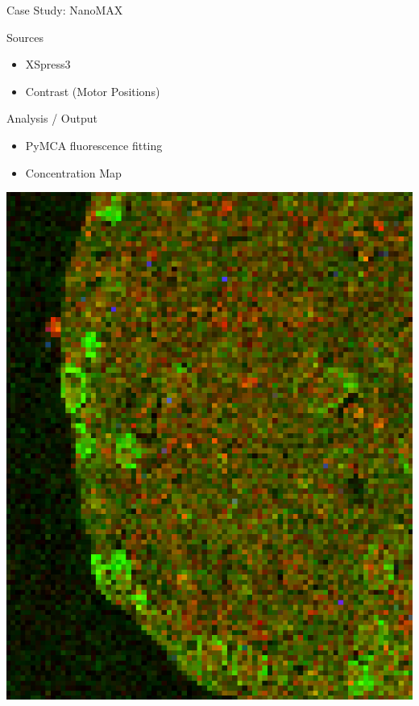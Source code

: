 \documentclass[aspectratio=169]{beamer}
\begin{document}
\begin{frame}{Case Study: NanoMAX}
\begin{minipage}{0.6\textwidth}
  \begin{block}{Sources}
   \begin{itemize}
    \item XSpress3
    \item Contrast (Motor Positions)
   \end{itemize}
  \end{block}

  \begin{block}{Analysis / Output}
   \begin{itemize}
    \item PyMCA fluorescence fitting
    \item Concentration Map
   \end{itemize}
  \end{block}

\end{minipage}
\begin{minipage}{0.39\textwidth}
 \includegraphics[width=\textwidth]{img/xrf}
\end{minipage}

\end{frame}
\end{document}
